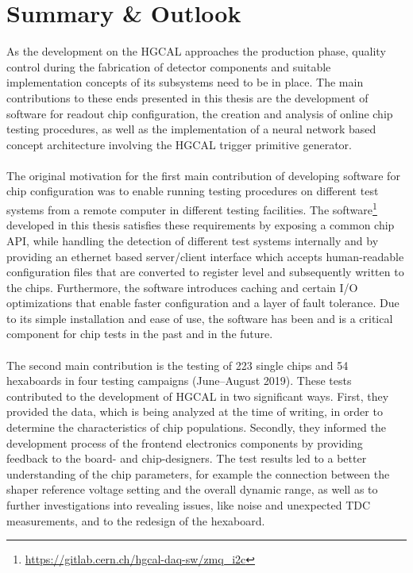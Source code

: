 \documentclass[../../main.tex]{subfiles}
\begin{document}
\section{Summary \& Outlook}
As the development on the HGCAL approaches the production phase, quality control during the fabrication of detector components and suitable implementation concepts of its subsystems need to be in place. The main contributions to these ends presented in this thesis are the development of software for readout chip configuration, the creation and analysis of online chip testing procedures, as well as the implementation of a neural network based concept architecture involving the HGCAL trigger primitive generator.\\
\\
The original motivation for the first main contribution of developing software for chip configuration was to enable running testing procedures on different test systems from a remote computer in different testing facilities. The software\footnote{\url{https://gitlab.cern.ch/hgcal-daq-sw/zmq_i2c}} developed in this thesis satisfies these requirements by exposing a common chip API, while handling the detection of different test systems internally and by providing an ethernet based server/client interface which accepts human-readable configuration files that are converted to register level and subsequently written to the chips. Furthermore, the software introduces caching and certain I/O optimizations that enable faster configuration and a layer of fault tolerance. Due to its simple installation and ease of use, the software has been and is a critical component for chip tests in the past and in the future.\\
\\
The second main contribution is the testing of 223 single chips and 54 hexaboards in four testing campaigns (June--August 2019). These tests contributed to the development of HGCAL in two significant ways. First, they provided the data, which is being analyzed at the time of writing, in order to determine the characteristics of chip populations. Secondly, they informed the development process of the frontend electronics components by providing feedback to the board- and chip-designers. The test results led to a better understanding of the chip parameters, for example the connection between the shaper reference voltage setting and the overall dynamic range, as well as to further investigations into revealing issues, like noise and unexpected TDC measurements, and to the redesign of the hexaboard.\\
\end{document}

